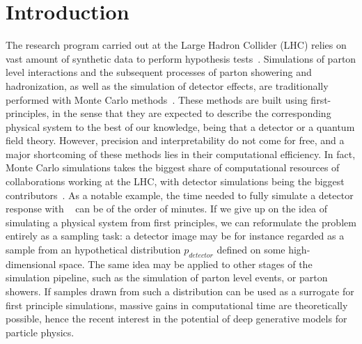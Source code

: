 
\chapter{Introduction}\label{chap:introduction}
\enlargethispage{2ex}
\vspace*{-2pt}

The research program carried out at the Large Hadron Collider (LHC) relies on vast amount of synthetic data to perform hypothesis tests~\cite{Apostolakis:2308666, Aarrestad:2729448, Calafiura:2729668, ATL-SOFT-PUB-2018-002}. Simulations of parton level interactions and the subsequent processes of parton showering and hadronization, as well as the simulation of detector effects, are traditionally performed with Monte Carlo methods~\cite{delphes, madgraph, pythia, Bothmann:2019yzt}. These methods are built using first-principles, in the sense that they are expected to describe the corresponding physical system to the best of our knowledge, being that a detector or a quantum field theory. 
However, precision and interpretability do not come for free, and a major shortcoming of these methods lies in their computational efficiency. In fact, Monte Carlo simulations takes the biggest share of computational resources of collaborations working at the LHC, with detector simulations being the biggest contributors~\cite{Calafiura:2729668}. As a notable example, the time needed to fully simulate a detector response with \geant~\cite{AGOSTINELLI2003250} can be of the order of minutes.
If we give up on the idea of simulating a physical system from first principles, we can reformulate the problem entirely as a sampling task: a detector image may be for instance regarded as a sample from an hypothetical distribution $p_{detector}$ defined on some high-dimensional space. The same idea may be applied to other stages of the simulation pipeline, such as the simulation of parton level events, or parton showers.
If samples drawn from such a distribution can be used as a surrogate for first principle simulations, massive gains in computational time are theoretically possible, hence the recent interest in the potential of deep generative models for particle physics\cite{aachen_wgan1, aachen_wgan2, Erdmann:2018kuh, wgan_0, calogan1, calogan2, 2020GANpileup, 2019Lund, DijetGAN1, DijetGAN2, Diefenbacher:2020rna, 2021Getting, ATL-SOFT-PUB-2018-001, 2020iflow1, 2020iflow2, dohi2020variational}. 


